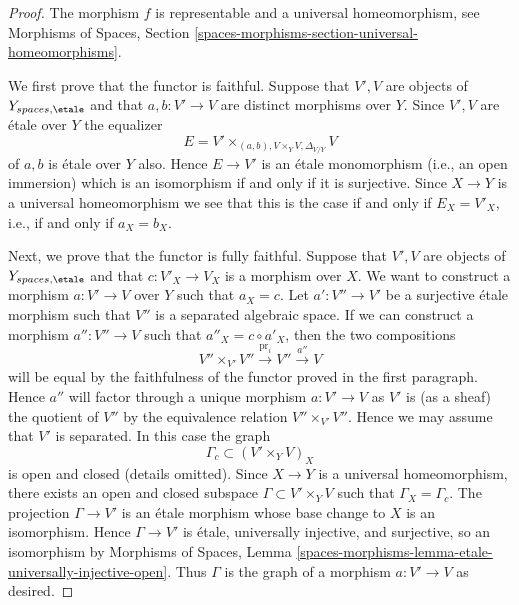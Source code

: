 \begin{proof}
The morphism $f$ is representable and a universal homeomorphism, see
Morphisms of Spaces,
Section \ref{spaces-morphisms-section-universal-homeomorphisms}.

\medskip\noindent
We first prove that the functor is faithful.
Suppose that $V', V$ are objects of $Y_{spaces, \etale}$ and
that $a, b : V' \to V$ are distinct morphisms over $Y$.
Since $V', V$ are \'etale over $Y$ the equalizer
$$
E =  V' \times_{(a, b), V \times_Y V, \Delta_{V/Y}} V
$$
of $a, b$ is \'etale over $Y$ also. Hence $E \to V'$ is an \'etale monomorphism
(i.e., an open immersion) which is an isomorphism if and only if it is
surjective. Since $X \to Y$ is a universal homeomorphism we see that this
is the case if and only if $E_X = V'_X$, i.e., if and only if $a_X = b_X$.

\medskip\noindent
Next, we prove that the functor is fully faithful.
Suppose that $V', V$ are objects of $Y_{spaces, \etale}$ and
that $c : V'_X \to V_X$ is a morphism over $X$. We want to construct
a morphism $a : V' \to V$ over $Y$ such that $a_X = c$.
Let $a' : V'' \to V'$ be a surjective \'etale morphism such that $V''$ is
a separated algebraic space. If we can construct a morphism
$a'' : V'' \to V$ such that $a''_X = c \circ a'_X$, then the two compositions
$$
V'' \times_{V'} V'' \xrightarrow{\text{pr}_i} V'' \xrightarrow{a''} V
$$
will be equal by the faithfulness of the functor proved in the first
paragraph. Hence $a''$ will factor through a unique morphism
$a : V' \to V$ as $V'$ is (as a sheaf) the quotient of $V''$ by
the equivalence relation $V'' \times_{V'} V''$. Hence we may assume that
$V'$ is separated. In this case the graph
$$
\Gamma_c \subset (V' \times_Y V)_X
$$
is open and closed (details omitted). Since $X \to Y$ is a universal
homeomorphism, there exists an open and closed subspace
$\Gamma \subset V' \times_Y V$ such that $\Gamma_X = \Gamma_c$.
The projection $\Gamma \to V'$ is an \'etale morphism whose base
change to $X$ is an isomorphism. Hence $\Gamma \to V'$ is \'etale,
universally injective, and surjective, so an isomorphism by
Morphisms of Spaces,
Lemma \ref{spaces-morphisms-lemma-etale-universally-injective-open}.
Thus $\Gamma$ is the graph of a morphism $a : V' \to V$ as desired.


\end{proof}
